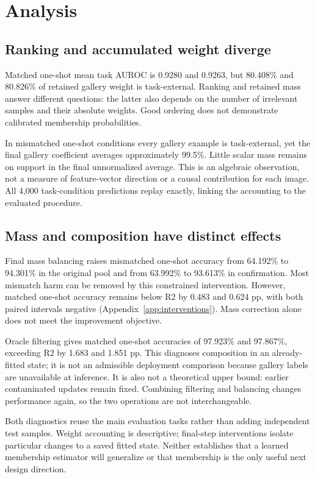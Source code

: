 \section{Analysis}
\subsection{Ranking and accumulated weight diverge}

Matched one-shot mean task AUROC is 0.9280 and 0.9263, but 80.408\% and 80.826\% of retained gallery weight is task-external. Ranking and retained mass answer different questions: the latter also depends on the number of irrelevant samples and their absolute weights. Good ordering does not demonstrate calibrated membership probabilities.

In mismatched one-shot conditions every gallery example is task-external, yet the final gallery coefficient averages approximately 99.5\%. Little scalar mass remains on support in the final unnormalized average. This is an algebraic observation, not a measure of feature-vector direction or a causal contribution for each image. All 4,000 task-condition predictions replay exactly, linking the accounting to the evaluated procedure.

\subsection{Mass and composition have distinct effects}

Final mass balancing raises mismatched one-shot accuracy from 64.192\% to 94.301\% in the original pool and from 63.992\% to 93.613\% in confirmation. Most mismatch harm can be removed by this constrained intervention. However, matched one-shot accuracy remains below R2 by 0.483 and 0.624 pp, with both paired intervals negative (Appendix~\ref{app:interventions}). Mass correction alone does not meet the improvement objective.

Oracle filtering gives matched one-shot accuracies of 97.923\% and 97.867\%, exceeding R2 by 1.683 and 1.851 pp. This diagnoses composition in an already-fitted state; it is not an admissible deployment comparison because gallery labels are unavailable at inference. It is also not a theoretical upper bound: earlier contaminated updates remain fixed. Combining filtering and balancing changes performance again, so the two operations are not interchangeable.

Both diagnostics reuse the main evaluation tasks rather than adding independent test samples. Weight accounting is descriptive; final-step interventions isolate particular changes to a saved fitted state. Neither establishes that a learned membership estimator will generalize or that membership is the only useful next design direction.
